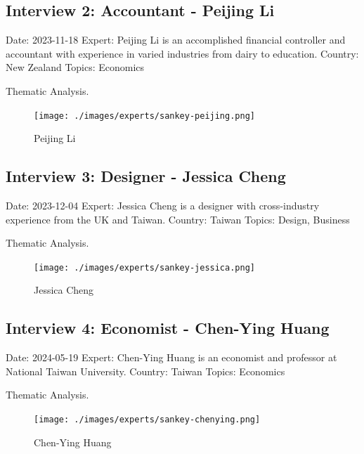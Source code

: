 \documentclass[
  letterpaper,
  DIV=11,
  numbers=noendperiod]{scrartcl}
\begin{document}
\subsection{Interview 2: Accountant - Peijing
Li}\label{interview-2-accountant---peijing-li}

Date: 2023-11-18 Expert: Peijing Li is an accomplished financial
controller and accountant with experience in varied industries from
dairy to education. Country: New Zealand Topics: Economics

Thematic Analysis.

\begin{figure}[H]

{\centering \texttt{[image: ./images/experts/sankey-peijing.png]}

}

\caption{Peijing Li}

\end{figure}%

\subsection{Interview 3: Designer - Jessica
Cheng}\label{interview-3-designer---jessica-cheng}

Date: 2023-12-04 Expert: Jessica Cheng is a designer with cross-industry
experience from the UK and Taiwan. Country: Taiwan Topics: Design,
Business

Thematic Analysis.

\begin{figure}[H]

{\centering \texttt{[image: ./images/experts/sankey-jessica.png]}

}

\caption{Jessica Cheng}

\end{figure}%

\subsection{Interview 4: Economist - Chen-Ying
Huang}\label{interview-4-economist---chen-ying-huang}

Date: 2024-05-19 Expert: Chen-Ying Huang is an economist and professor
at National Taiwan University. Country: Taiwan Topics: Economics

Thematic Analysis.

\begin{figure}[H]

{\centering \texttt{[image: ./images/experts/sankey-chenying.png]}

}

\caption{Chen-Ying Huang}

\end{figure}%
\end{document}
